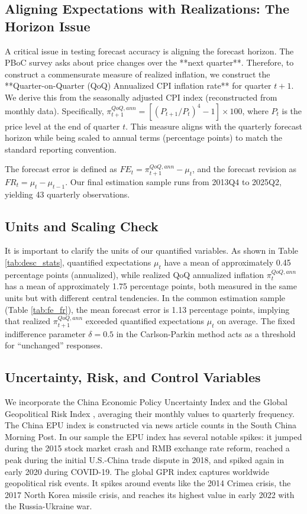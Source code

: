 \documentclass[12pt]{article}
\begin{document}
\subsection{Aligning Expectations with Realizations: The Horizon Issue}\label{sec:horizon}
A critical issue in testing forecast accuracy is aligning the forecast horizon. The PBoC survey asks about price changes over the **next quarter**. Therefore, to construct a commensurate measure of realized inflation, we construct the **Quarter-on-Quarter (QoQ) Annualized CPI inflation rate** for quarter $t+1$. We derive this from the seasonally adjusted CPI index (reconstructed from monthly data). Specifically, $\pi^{QoQ,ann}_{t+1} = [ (P_{t+1}/P_{t})^4 - 1 ] \times 100$, where $P_t$ is the price level at the end of quarter $t$. This measure aligns with the quarterly forecast horizon while being scaled to annual terms (percentage points) to match the standard reporting convention.

The forecast error is defined as $FE_t = \pi^{QoQ,ann}_{t+1} - \mu_t$, and the forecast revision as $FR_t = \mu_t - \mu_{t-1}$. Our final estimation sample runs from 2013Q4 to 2025Q2, yielding 43 quarterly observations.

\subsection{Units and Scaling Check}
It is important to clarify the units of our quantified variables. As shown in Table \ref{tab:desc_stats}, quantified expectations $\mu_t$ have a mean of approximately 0.45 percentage points (annualized), while realized QoQ annualized inflation $\pi^{QoQ,ann}_t$ has a mean of approximately 1.75 percentage points, both measured in the same units but with different central tendencies. In the common estimation sample (Table \ref{tab:fe_fr}), the mean forecast error is 1.13 percentage points, implying that realized $\pi _{t+1}^{QoQ,ann}$ exceeded quantified expectations $\mu_t$ on average. The fixed indifference parameter $\delta=0.5$ in the Carlson-Parkin method acts as a threshold for ``unchanged'' responses.

\subsection{Uncertainty, Risk, and Control Variables}
We incorporate the China Economic Policy Uncertainty Index \cite{Baker2016} and the Global Geopolitical Risk Index \cite{Caldara2022}, averaging their monthly values to quarterly frequency. The China EPU index is constructed via news article counts in the South China Morning Post. In our sample the EPU index has several notable spikes: it jumped during the 2015 stock market crash and RMB exchange rate reform, reached a peak during the initial U.S.-China trade dispute in 2018, and spiked again in early 2020 during COVID-19. The global GPR index captures worldwide geopolitical risk events. It spikes around events like the 2014 Crimea crisis, the 2017 North Korea missile crisis, and reaches its highest value in early 2022 with the Russia-Ukraine war.
\end{document}
